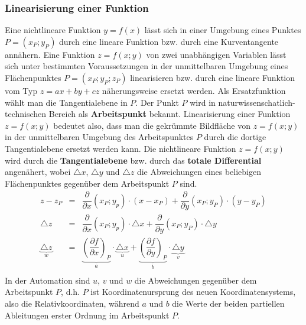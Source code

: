 \subsubsection{Linearisierung einer Funktion}
Eine nichtlineare Funktion $y=f\left(x\right)$ lässt sich in einer Umgebung eines Punktes $P=\left(x_P; y_P\right)$ durch eine lineare Funktion bzw. durch eine Kurventangente annähern. Eine Funktion $z=f\left(x; y\right)$ von zwei unabhängigen Variablen lässt sich unter bestimmten Voraussetzungen in der unmittelbaren Umgebung eines Flächenpunktes $P=\left(x_P; y_P; z_P\right)$ linearisieren bzw. durch eine lineare Funktion vom Typ $z=ax+by+cz$ näherungsweise ersetzt werden. Als Ersatzfunktion wählt man die Tangentialebene in $P$. Der Punkt $P$ wird in naturwissenschatlich-technischen Bereich als \textbf{Arbeitspunkt} bekannt.
\newline\newline
Linearisierung einer Funktion $z=f\left(x; y\right)$ bedeutet also, dass man die gekrümmte Bildfläche von $z=f\left(x; y\right)$ in der unmittelbaren Umgebung des Arbeitspunktes $P$ durch die dortige Tangentialebene ersetzt werden kann. Die nichtlineare Funktion $z=f\left(x; y\right)$ wird durch die \textbf{Tangentialebene} bzw. durch das \textbf{totale Differential} angenähert, wobei $\triangle x$, $\triangle y$ und $\triangle z$ die Abweichungen eines beliebigen Flächenpunktes gegenüber dem Arbeitspunkt $P$ sind.
\begin{equation}
\boxed{
\begin{array}{lll}
z-z_P&=&\dfrac{\partial}{\partial x}\left(x_P; y_p\right)\cdot \left(x-x_P\right)+\dfrac{\partial}{\partial y}\left(x_P; y_P\right)\cdot \left(y-y_P\right)\\
\triangle z&=&\dfrac{\partial}{\partial x}\left(x_P; y_p\right)\cdot \triangle x+\dfrac{\partial}{\partial y}\left(x_P; y_P\right)\cdot \triangle y\\
\underbrace{\triangle z}_{w}&=&\underbrace{\left(\dfrac{\partial f}{\partial x}\right)_P}_{a}\cdot \underbrace{\triangle x}_{u}+\underbrace{\left(\dfrac{\partial f}{\partial y}\right)_P}_{b}\cdot \underbrace{\triangle y}_{v}\\
\end{array}
}
\end{equation}
In der Automation sind $u$, $v$ und $w$ die Abweichungen gegenüber dem Arbeitspunkt $P$, d.h. $P$ ist Koordinatenursprung des neuen Koordinatensystems, also die Relativkoordinaten, während $a$ und $b$ die Werte der beiden partiellen Ableitungen erster Ordnung im Arbeitspunkt $P$. 
